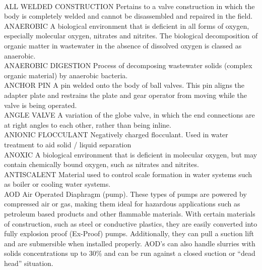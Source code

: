\documentclass{article}
\begin{document}
\vspace{0.3cm}\\
ALL WELDED CONSTRUCTION
Pertains to a valve construction in which the body is completely welded and cannot be disassembled and repaired in the field.
\vspace{0.3cm}\\
ANAEROBIC
A biological environment that is deficient in all forms of oxygen, especially molecular oxygen, nitrates and nitrites. The biological decomposition of organic matter in wastewater in the absence of dissolved oxygen is classed as anaerobic.
\vspace{0.3cm}\\
ANAEROBIC DIGESTION
Process of decomposing wastewater solids (complex organic material) by anaerobic bacteria.
\vspace{0.3cm}\\
ANCHOR PIN
A pin welded onto the body of ball valves. This pin aligns the adapter plate and restrains the plate and gear operator from moving while the valve is being operated.
\vspace{0.3cm}\\
ANGLE VALVE
A variation of the globe valve, in which the end connections are at right angles to each other, rather than being inline.
\vspace{0.3cm}\\
ANIONIC FLOCCULANT
Negatively charged flocculant. Used in water treatment to aid solid / liquid separation
\vspace{0.3cm}\\
ANOXIC
A biological environment that is deficient in molecular oxygen, but may contain chemically bound oxygen, such as nitrates and nitrites.
\vspace{0.3cm}\\
ANTISCALENT
Material used to control scale formation in water systems such as boiler or cooling water systems.
\vspace{0.3cm}\\
AOD
Air Operated Diaphragm (pump). These types of pumps are powered by compressed air or gas, making them ideal for hazardous applications such as petroleum based products and other flammable materials. With certain materials of construction, such as steel or conductive plastics, they are easily converted into fully explosion proof (Ex-Proof) pumps. Additionally, they can pull a suction lift and are submersible when installed properly. AOD’s can also handle slurries with solids concentrations up to 30\% and can be run against a closed suction or “dead head” situation.
\end{document}
